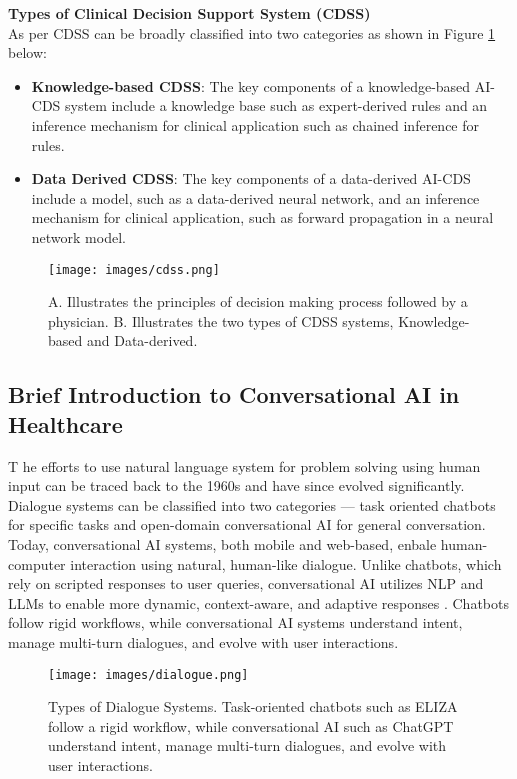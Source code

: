 \noindent \textcolor{TUMBlue}{\textbf{Types of Clinical Decision Support System (CDSS)}}\\
As per \cite{visweswaran2022integration} CDSS can be broadly classified into two categories as shown in Figure \ref{fig:cdss} below:
\begin{itemize}
    \item \textcolor{TUMRed}{\textbf{Knowledge-based CDSS}}: The key components of a knowledge-based AI-CDS system include a knowledge base such as expert-derived rules and an inference mechanism for clinical application such as chained inference for rules.
    \item \textcolor{TUMRed}{\textbf{Data Derived CDSS}}: The key components of a data-derived AI-CDS include a model, such as a data-derived neural network, and an inference mechanism for clinical application, such as forward propagation in a neural network model.
\end{itemize}
\begin{figure}[H]
    \centering
    \texttt{[image: images/cdss.png]}
    \caption{A. Illustrates the principles of decision making process followed by a physician. B. Illustrates the two types of CDSS systems, Knowledge-based and Data-derived.}
    \label{fig:cdss}
\end{figure}

\subsection{Brief Introduction to Conversational AI in Healthcare}
\lettrine{T}{ }he efforts to use natural language system for problem solving using human input can be traced back to the 1960s \cite{bobrow1964natural} and have since evolved significantly. Dialogue systems can be classified into two categories --- task oriented chatbots for specific tasks and open-domain conversational AI for general conversation. Today, conversational AI systems, both mobile and web-based, enbale human-computer interaction using natural, human-like dialogue. Unlike chatbots, which rely on scripted responses to user queries, conversational AI utilizes NLP and LLMs to enable more dynamic, context-aware, and adaptive responses \cite{jurafsky2000speech}. Chatbots follow rigid workflows, while conversational AI systems understand intent, manage multi-turn dialogues, and evolve with user interactions.
\begin{figure}[H]
    \centering
    \texttt{[image: images/dialogue.png]}
    \caption{Types of Dialogue Systems. Task-oriented chatbots such as ELIZA follow a rigid workflow, while conversational AI such as ChatGPT understand intent, manage multi-turn dialogues, and evolve with user interactions.}
    \label{fig:dialogue}
\end{figure}

